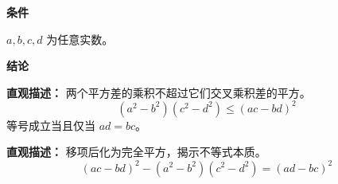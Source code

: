 \begin{statementbox}
	\textbf{\textcolor{CStatement}{条件}}
	\begin{description}[style=nextline, leftmargin=2.8em, labelsep=0.5em, itemsep=0.35em]
		\item[\textbf{\textcolor{CStatement}{条件一（实数变量）：}}] $a,b,c,d$ 为任意实数。
	\end{description}

	\textbf{\textcolor{CStatement}{结论}}
	\begin{description}[style=nextline, leftmargin=2.8em, labelsep=0.5em, itemsep=0.45em]
		\item[\textbf{\textcolor{CStatement}{结论一（平方差型）：}}]
			\textbf{\textcolor{CStatement}{直观描述：}}
			两个平方差的乘积不超过它们交叉乘积差的平方。
			\[
				(a^2-b^2)(c^2-d^2)\leqslant(ac-bd)^2
			\]
			等号成立当且仅当 $ad=bc$。

		\item[\textbf{\textcolor{CStatement}{推广结论（等价恒等式）：}}]
			\textbf{\textcolor{CStatement}{直观描述：}}
			移项后化为完全平方，揭示不等式本质。
			\[
				(ac-bd)^2-(a^2-b^2)(c^2-d^2)=(ad-bc)^2
			\]
	\end{description}
\end{statementbox}
